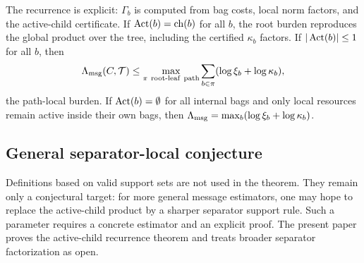 The recurrence is explicit: \(\Gamma_b\) is computed from bag costs, local norm factors, and the active-child certificate. If \(\operatorname{Act}(b)=\operatorname{ch}(b)\) for all \(b\), the root burden reproduces the global product over the tree, including the certified \(\kappa_b\) factors. If \(|\operatorname{Act}(b)|\le 1\) for all \(b\), then
\[
\Lammsg(C,\T)\le
\max_{\pi\ \mathrm{root\text{-}leaf\ path}}\sum_{b\in\pi}(\log\xi_b+\log\kappa_b),
\]
the path-local burden. If \(\operatorname{Act}(b)=\emptyset\) for all internal bags and only local resources remain active inside their own bags, then \(\Lambda_{\mathrm{msg}}=\max_b(\log\xi_b+\log\kappa_b)\).

\subsection{General separator-local conjecture}

Definitions based on valid support sets are not used in the theorem. They remain only a conjectural target: for more general message estimators, one may hope to replace the active-child product by a sharper separator support rule. Such a parameter requires a concrete estimator and an explicit proof. The present paper proves the active-child recurrence theorem and treats broader separator factorization as open.
